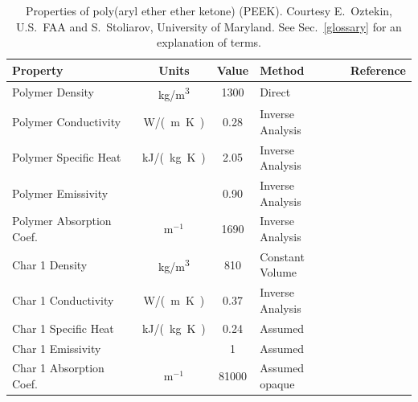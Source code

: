\begin{table}[p]
\caption[Properties of poly(aryl ether ether ketone) (PEEK)]{Properties of poly(aryl ether ether ketone) (PEEK). Courtesy E.~Oztekin, U.S.~FAA and S.~Stoliarov,
University of Maryland. See Sec.~\ref{glossary} for an explanation of terms.}
\begin{center}
\begin{tabular}{|l|c|c|l|l|}
\hline
Property                    & Units         & Value                             & Method                    &  Reference                              \\ \hline \hline
Polymer Density             & \unit{kg/m^3}      & 1300                              & Direct                    &  \cite{Oztekin:CF2012}                  \\ \hline
Polymer Conductivity        & \unit{W/(m.K)}& 0.28                              & Inverse Analysis          &  \cite{Oztekin:CF2012}                  \\ \hline
Polymer Specific Heat       & \unit{kJ/(kg.K)}       & 2.05                              & Inverse Analysis          &  \cite{Oztekin:CF2012}                  \\ \hline
Polymer Emissivity          &               & 0.90                              & Inverse Analysis          &  \cite{Oztekin:CF2012}                  \\ \hline
Polymer Absorption Coef.    & m$^{-1}$      & 1690                              & Inverse Analysis          &  \cite{Oztekin:CF2012}                  \\ \hline
Char 1 Density              & \unit{kg/m^3}      & 810                               & Constant Volume           &  \cite{Oztekin:CF2012}                  \\ \hline
Char 1 Conductivity         & \unit{W/(m.K)}& 0.37                              & Inverse Analysis          &  \cite{Oztekin:CF2012}                  \\ \hline
Char 1 Specific Heat        & \unit{kJ/(kg.K)}       & 0.24                              & Assumed                   &  \cite{Oztekin:CF2012}                  \\ \hline
Char 1 Emissivity           &               & 1                                 & Assumed                   &  \cite{Oztekin:CF2012}                  \\ \hline
Char 1 Absorption Coef.     & m$^{-1}$      & 81000                             & Assumed opaque            &  \cite{Oztekin:CF2012}                  \\ \hline

\end{tabular}
\end{center}
\end{table}
